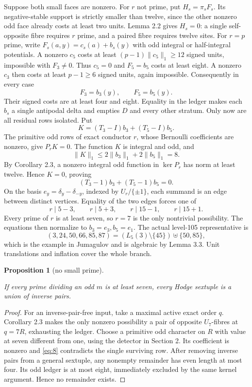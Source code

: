 \documentclass[11pt]{amsart}
\numberwithin{theorem}{section}
\newtheorem{proposition}[theorem]{Proposition}
\theoremstyle{remark}
\numberwithin{equation}{section}
\begin{document}
Suppose both small faces are nonzero. For \(r\) not prime, put
\(H_s=\pi_sF_s\). Its negative-stable support is strictly smaller than
twelve, since the other nonzero odd face already costs at least two
units. Lemma 2.2 gives \(H_s=0\): a single self-opposite fibre requires
\(r\) prime, and a paired fibre requires twelve sites. For \(r=p\)
prime, write \(F_s(a,y)=c_s(a)+b_s(y)\) with odd integral or
half-integral potentials. A nonzero \(c_5\) costs at least
\((p-1)\|c_5\|_1\ge12\) signed units, impossible with \(F_3\ne0\).
Thus \(c_5=0\) and \(F_5=b_5\) costs at least eight. A nonzero
\(c_3\) then costs at least \(p-1\ge6\) signed units, again
impossible. Consequently in every case
\[
F_3=b_3(y),\qquad F_5=b_5(y).
\]
Their signed costs are at least four and eight. Equality in the ledger
makes each \(b_s\) a single antipodal delta and empties \(D\) and every
other stratum. Only now are all residual rows isolated. Put
\[
K=(T_3-I)b_3+(T_5-I)b_5.
\]
The primitive odd rows of exact conductor \(r\), whose Bernoulli
coefficients are nonzero, give \(P_rK=0\). The function \(K\) is
integral and odd, and
\[
\|K\|_1\le2\|b_3\|_1+2\|b_5\|_1=8.
\]
By Corollary 2.3, a nonzero integral odd function in \(\ker P_r\)
has norm at least twelve. Hence \(K=0\), proving
\[
(T_3-1)b_3+(T_5-1)b_5=0.
\tag{22}\label{eq:22}
\]
On the basis \(e_y=\delta_y-\delta_{-y}\), indexed by
\(U_r/\{\pm1\}\), each summand is an edge between distinct vertices.
Equality of the two edges forces one of
\[
r\mid5-3,\qquad r\mid5+3,\qquad r\mid15-1,\qquad r\mid15+1.
\]
Every prime of \(r\) is at least seven, so \(r=7\) is the only
nontrivial possibility. The equations then normalize to
\(b_3=e_3,b_5=e_1\). The actual level-105 representative is
\[
(3,24,50,66,85,87)=(L_5(3)\setminus\{45\})\uplus\{50,85\},
\]
which is the example in Jumagulov \cite[Theorem 1.3, p.~4]{jumagulov2026} and is
algebraic by Lemma 3.3. Unit translations and inflation cover
the whole branch.

\begin{proposition}[no small prime]\label{proposition:10.1}

If every prime dividing an odd \(m\) is at least seven, every Hodge
sextuple is a union of inverse pairs.

\end{proposition}
\begin{proof}

For an inverse-pair-free input, take a maximal active exact order \(q\).
Corollary 2.3 makes the only nonzero possibility a pair of opposite
\(U_7\)-fibres at \(q=7R\), exhausting the ledger. Choose a primitive
odd character on \(R\) with value at seven different from one, using
the detector in Section 2. Its coefficient is nonzero and \eqref{eq:8} contradicts
the single surviving row. After removing inverse pairs from a general
sextuple, any nonempty remainder has even length at most four. Its odd
ledger is at most eight, immediately excluded by the same kernel
argument. Hence no remainder exists.
\end{proof}
\end{document}
